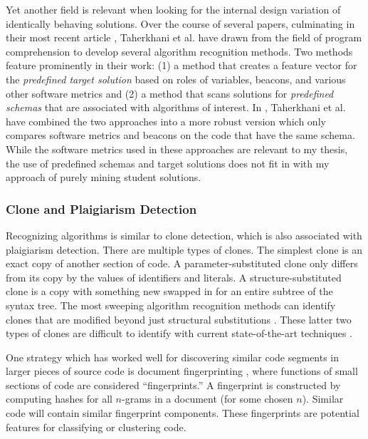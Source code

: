 \documentclass[12pt]{article}
\begin{document}
Yet another field is relevant when looking for the internal design variation of identically behaving solutions. Over the course of several papers, culminating in their most recent article \cite{taherkhani13}, Taherkhani et al. have drawn from the field of program comprehension to develop several algorithm recognition methods. Two methods feature prominently in their work: (1) a method that creates a feature vector for the \emph{predefined target solution} based on roles of variables, beacons, and various other software metrics and (2) a method that scans solutions for \emph{predefined schemas} that are associated with algorithms of interest. In \cite{taherkhani13}, Taherkhani et al. have combined the two approaches into a more robust version which only compares software metrics and beacons on the code that have the same schema. While the software metrics used in these approaches are relevant to my thesis, the use of predefined schemas and target solutions does not fit in with my approach of purely mining student solutions.

\subsubsection{Clone and Plaigiarism Detection}

Recognizing algorithms is similar to clone detection, which is also associated with plaigiarism detection. There are multiple types of clones. The simplest clone is an exact copy of another section of code. A parameter-substituted clone only differs from its copy by the values of identifiers and literals. A structure-substituted clone is a copy with something new swapped in for an entire subtree of the syntax tree. The most sweeping algorithm recognition methods can identify clones that are modified beyond just structural substitutions \cite{tiarks2011extended}. These latter two types of clones are difficult to identify with current state-of-the-art techniques \cite{taherkhani12, taherkhani13}. 

One strategy which has worked well for discovering similar code segments in larger pieces of source code is document fingerprinting \cite{schleimer2003winnowing}, where functions of small sections of code are considered ``fingerprints.'' A fingerprint is constructed by computing hashes for all $n$-grams in a document (for some chosen $n$). Similar code will contain similar fingerprint components. These fingerprints are potential features for classifying or clustering code.

\end{document}

